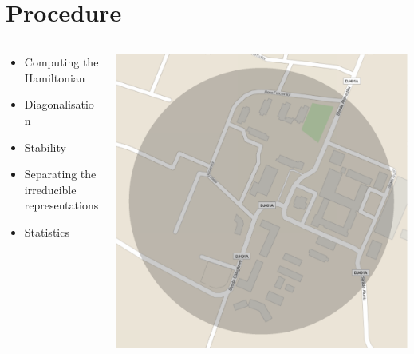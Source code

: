 \documentclass[a4,compress]{beamer}
\begin{document}
\section{Procedure}

\begin{frame}
  \begin{columns}[c]
    \begin{column}{0.4\textwidth}
      \begin{itemize}
        \item Computing the Hamiltonian
        \item Diagonalisation
        \item Stability
        \item Separating the irreducible representations
        \item Statistics
      \end{itemize}
    \end{column}
    \begin{column}{0.6\textwidth}
      \includegraphics[scale=0.22]{largest_matrix_m}

\end{column}
\end{columns}
\end{frame}
\end{document}
